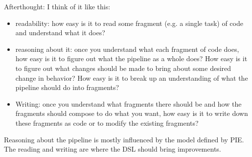 Afterthought: I think of it like this:
\begin{itemize}
  \item readability: how easy is it to read some fragment (e.g. a single task) of code and understand what it does?
  \item reasoning about it: once you understand what each fragment of code does, how easy is it to figure out what the pipeline as a whole does?
  How easy is it to figure out what changes should be made to bring about some desired change in behavior?
  How easy is it to break up an understanding of what the pipeline should do into fragments?
  \item Writing: once you understand what fragments there should be and how the fragments should compose to do what you want, how easy is it to write down these fragments as code or to modify the existing fragments?
\end{itemize}

Reasoning about the pipeline is mostly influenced by the model defined by PIE.
The reading and writing are where the DSL should bring improvements.

